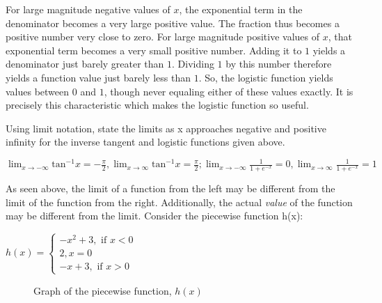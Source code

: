 For large magnitude negative values of $x$, the exponential term in the denominator 
becomes a very large positive value. The fraction thus becomes a positive number 
very close to zero. For large magnitude positive values of $x$, that exponential 
term becomes a very small positive number. Adding it to $1$ yields a denominator 
just barely greater than $1$. Dividing $1$ by this number therefore yields a function 
value just barely less than $1$. So, the logistic function yields values between 
$0$ and $1$, though never equaling either of these values exactly. It is precisely 
this characteristic which makes the logistic function so useful.

\begin{Exercise}[title=Limits Practice 3, label=limits3]
Using limit notation, state the limits as x approaches negative and positive 
infinity for the inverse tangent and logistic functions given above.
  \vspace{40mm}
\end{Exercise}
\begin{Answer}[ref=limits3] 
	$ \lim_{x \rightarrow -\infty} \text{tan}^{-1}x = -\frac{\pi}{2}, \lim_{x 
	\rightarrow \infty} \text{tan}^{-1}x = \frac{\pi}{2}; \lim_{x \rightarrow 
	-\infty} \frac{1}{1 + e^{-x}} = 0, \lim_{x \rightarrow \infty} \frac{1}{1 + 
	e^{-x}} = 1 $
\end{Answer}


As seen above, the limit of a function from the left may be different from the 
limit of the function from the right. Additionally, the actual \textit{value} of 
the function may be different from the limit. Consider the piecewise function h(x):

$h(x) = \begin{cases}
    -x^2+3, \text{ if } x < 0\\
    2, x=0\\
    -x+3, \text{ if } x > 0
\end{cases}$

\begin{figure}[htbp]
\centering
{}
\caption{Graph of the piecewise function, $h(x)$}
\end{figure}


